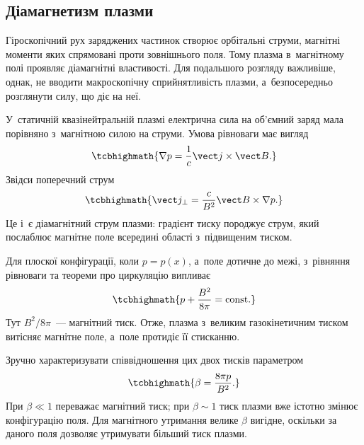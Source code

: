 \subsection*{Діамагнетизм плазми}



Гіроскопічний рух заряджених частинок створює орбітальні струми, магнітні моменти яких
спрямовані проти зовнішнього поля. Тому плазма в~магнітному полі проявляє діамагнітні
властивості. Для подальшого розгляду важливіше, однак, не вводити макроскопічну
сприйнятливість плазми, а~безпосередньо розглянути силу, що діє на неї.

У~статичній квазінейтральній плазмі електрична сила на об'ємний заряд мала порівняно
з~магнітною силою на струми. Умова рівноваги має вигляд
\begin{equation}\label{eq:equilibrium}
	\tcbhighmath{\nabla p=\frac1c\vect j\times\vect B.}
\end{equation}
Звідси поперечний струм
\begin{equation}\label{eq:diamagnetic-current}
	\tcbhighmath{\vect j_\perp=\frac{c}{B^2}\vect B\times\nabla p.}
\end{equation}
Це і~є діамагнітний струм плазми: градієнт тиску породжує струм, який послаблює магнітне
поле всередині області з~підвищеним тиском.

Для плоскої конфігурації, коли $p=p(x)$, а~поле дотичне до межі, з~рівняння рівноваги та
теореми про циркуляцію випливає
\begin{equation}\label{eq:pressure-balance}
	\tcbhighmath{p+\frac{B^2}{8\pi}=\mathrm{const}.}
\end{equation}
Тут $B^2/8\pi$~--- магнітний тиск. Отже, плазма з~великим газокінетичним тиском витісняє
магнітне поле, а~поле протидіє її стисканню.

Зручно характеризувати співвідношення цих двох тисків параметром
\begin{equation}\label{eq:beta}
	\tcbhighmath{\beta=\frac{8\pi p}{B^2}.}
\end{equation}
При $\beta\ll1$ переважає магнітний тиск; при $\beta\sim1$ тиск плазми вже істотно змінює
конфігурацію поля. Для магнітного утримання велике $\beta$ вигідне, оскільки за даного
поля дозволяє утримувати більший тиск плазми.



